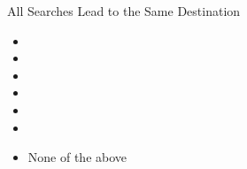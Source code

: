 \begin{problem}{All Searches Lead to the Same Destination}
\begin{question}
\begin{subquestion}[2]
	\begin{itemize}
	\item[]\solution{\emptycircle}{\Twodiia} 
	\item[]\solution{\emptycircle}{\Twodiib}  
	\item[]\solution{\emptycircle}{\Twodiic}  
	\item[]\solution{\emptycircle}{\Twodiid}  
	\item[]\solution{\emptycircle}{\Twodiie}  
	\item[]\solution{\emptycircle}{\Twodiif}  
	\item[]\solution{\emptycircle}{\Twodiig} None of the above
	\end{itemize} 
  \solution{\vspace{1cm}}{
    
  }
\end{subquestion}
\end{question}
\end{problem}
